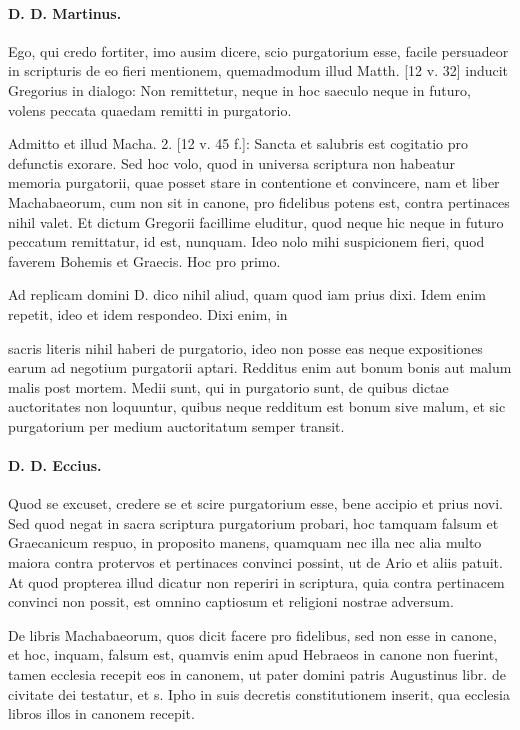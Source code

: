 \paragraph*{D. D. Martinus.}

Ego, qui credo fortiter, imo ausim dicere, scio purgatorium esse, facile persuadeor in scripturis de eo fieri mentionem, quemadmodum illud Matth. [12 v. 32] inducit Gregorius in dialogo: Non remittetur, neque in hoc saeculo neque in futuro, volens peccata quaedam remitti in purgatorio.

Admitto et illud Macha. 2. [12 v. 45 f.]: Sancta et salubris est cogitatio pro defunctis exorare. Sed hoc volo, quod in universa scriptura non habeatur memoria purgatorii, quae posset stare in contentione et convincere, nam et liber Machabaeorum, cum non sit in canone, pro fidelibus potens est, contra pertinaces nihil valet. Et dictum Gregorii facillime eluditur, quod neque hic neque in futuro peccatum remittatur, id est, nunquam. Ideo nolo mihi suspicionem fieri, quod faverem Bohemis et Graecis. Hoc pro primo.

Ad replicam domini D. dico nihil aliud, quam quod iam prius dixi. Idem enim repetit, ideo et idem respondeo. Dixi enim, in

sacris literis nihil haberi de purgatorio, ideo non posse eas neque expositiones earum ad negotium purgatorii aptari. Redditus enim aut bonum bonis aut malum malis post mortem. Medii sunt, qui in purgatorio sunt, de quibus dictae auctoritates non loquuntur, quibus neque redditum est bonum sive malum, et sic purgatorium per medium auctoritatum semper transit.

\paragraph*{D. D. Eccius.}

Quod se excuset, credere se et scire purgatorium esse, bene accipio et prius novi. Sed quod negat in sacra scriptura purgatorium probari, hoc tamquam falsum et Graecanicum respuo, in proposito manens, quamquam nec illa nec alia multo maiora contra protervos et pertinaces convinci possint, ut de Ario et aliis patuit. At quod propterea illud dicatur non reperiri in scriptura, quia contra pertinacem convinci non possit, est omnino captiosum et religioni nostrae adversum.

De libris Machabaeorum, quos dicit facere pro fidelibus, sed non esse in canone, et hoc, inquam, falsum est, quamvis enim apud Hebraeos in canone non fuerint, tamen ecclesia recepit eos in canonem, ut pater domini patris Augustinus libr. de civitate dei testatur, et s. Ipho in suis decretis constitutionem inserit, qua ecclesia libros illos in canonem recepit.

